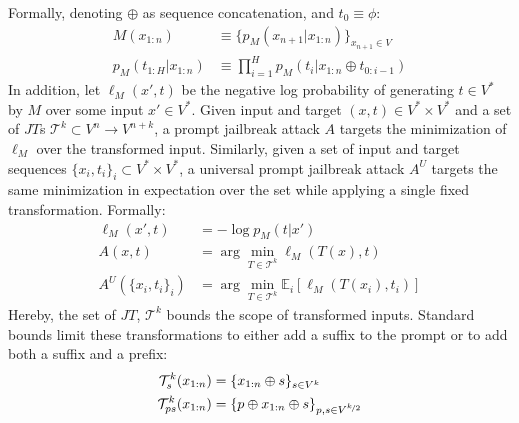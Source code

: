 \newpage
Formally, denoting $\oplus$ as sequence concatenation, and $t_{0} \equiv\phi$:
\begin{align}
M(x_{1:n})&\equiv\{p_M(x_{n+1} | x_{1:n})\}_{x_{n+1}\in V}\\
p_M(t_{1:H} | x_{1:n}) &\equiv \prod_{i=1}^{H} p_M(t_{i} | x_{1:n}\oplus t_{0:i-1})
\end{align}
In addition, let $\ell_M(x', t)$ be the negative log probability of generating $t\in V^*$ by $M$ over some input $x'\in V^*$. Given input and target $(x,t)\in V^*\times V^*$ and a set of $JT$s $\mathcal{T}^k\subset V^n\to V^{n+k}$, a prompt jailbreak attack $A$ targets the minimization of $\ell_M$ over the transformed input. Similarly, given a set of input and target sequences $\{x_i,t_i\}_i\subset V^*\times V^*$, a universal prompt jailbreak attack $A^U$ targets the same minimization in expectation over the set while applying a single fixed transformation. Formally:
\begin{align}
\ell_M(x', t) &= -\log p_M(t | x') \label{eq:att_crit} \\
A(x,t) &=\arg\min_{T \in \mathcal{T}^k} \ell_M(T(x), t) \label{eq:indiv_att}\\
A^U(\{x_i,t_i\}_i) &= \arg\min_{T \in \mathcal{T}^k} \mathbb{E}_i \left[ \ell_M(T(x_i), t_i) \right]\label{eq:univ_att}
\end{align} 
Hereby, the set of $JT$, $\mathcal{T}^k$ bounds the scope of transformed inputs. Standard bounds limit these transformations to either add a suffix to the prompt or to add both a suffix and a prefix:
\begin{align}
\mathcal{T}^k_{s}(x_{1:n}) &= \{x_{1:n}\oplus s\}_{s\in V^k}\\
\mathcal{T}^k_{ps}(x_{1:n}) &= \{p\oplus x_{1:n}\oplus s\}_{p,s\in V^{\nicefrac{k}{2}}}
\end{align}




